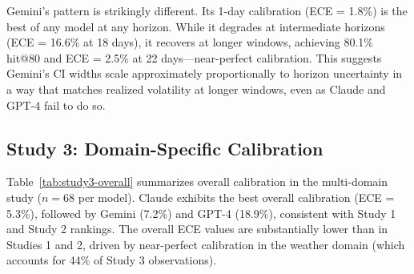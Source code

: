 Gemini's pattern is strikingly different. Its 1-day calibration (ECE = 1.8\%) is the
best of any model at any horizon. While it degrades at intermediate horizons
(ECE = 16.6\% at 18 days), it recovers at longer windows, achieving 80.1\% hit@80
and ECE = 2.5\% at 22 days---near-perfect calibration. This suggests Gemini's CI
widths scale approximately proportionally to horizon uncertainty in a way that matches
realized volatility at longer windows, even as Claude and GPT-4 fail to do so.

\begin{table}[ht]
  \centering
  \caption{Study 2: 80\% Hit Rate and ECE by Model and Prediction Horizon.
    Hit@80 = proportion of predictions where true outcome falls within 80\% CI.
    ECE = mean absolute calibration error across 50/80/90\% levels.}
  \label{tab:study2}
\end{table}

\subsection{Study 3: Domain-Specific Calibration}
\label{sec:results-study3}

Table~\ref{tab:study3-overall} summarizes overall calibration in the multi-domain
study ($n = 68$ per model). Claude exhibits the best overall calibration (ECE = 5.3\%),
followed by Gemini (7.2\%) and GPT-4 (18.9\%), consistent with Study 1 and Study 2
rankings. The overall ECE values are substantially lower than in Studies 1 and 2,
driven by near-perfect calibration in the weather domain (which accounts for 44\% of
Study 3 observations).

